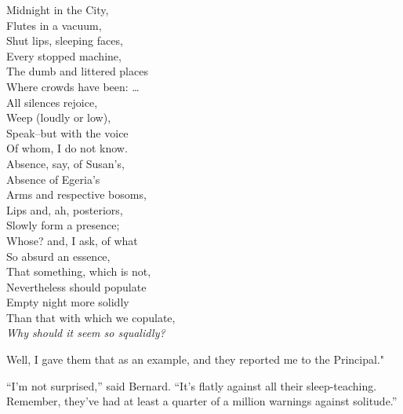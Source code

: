\documentclass[12pt]{report}
\begin{document}
Midnight in the City,\\

Flutes in a vacuum,\\

Shut lips, sleeping faces,\\

Every stopped machine,\\

The dumb and littered places\\

Where crowds have been: \ldots{}\\

All silences rejoice,\\

Weep (loudly or low),\\

Speak--but with the voice\\

Of whom, I do not know.\\

Absence, say, of Susan's,\\

Absence of Egeria's\\

Arms and respective bosoms,\\

Lips and, ah, posteriors,\\

Slowly form a presence;\\

Whose? and, I ask, of what\\

So absurd an essence,\\

That something, which is not,\\

Nevertheless should populate\\

Empty night more solidly\\

Than that with which we copulate,\\

\emph{Why should it seem so squalidly?\\
}

Well, I gave them that as an example, and they reported me to the
Principal."

``I'm not surprised,'' said Bernard. ``It's flatly against all their
sleep-teaching. Remember, they've had at least a quarter of a million
warnings against solitude.''
\end{document}
